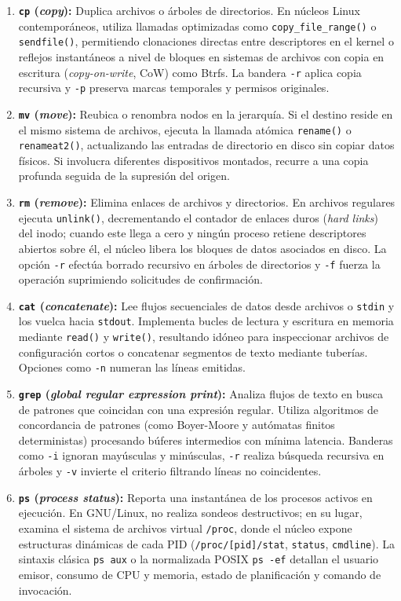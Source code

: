 \documentclass[12pt]{article}
\begin{document}
\begin{enumerate}[noitemsep, topsep=2pt]
    \item \textbf{\texttt{cp} (\textit{copy}):} Duplica archivos o árboles de directorios. En núcleos Linux contemporáneos, utiliza llamadas optimizadas como \texttt{copy\_file\_range()} o \texttt{sendfile()}, permitiendo clonaciones directas entre descriptores en el kernel o reflejos instantáneos a nivel de bloques en sistemas de archivos con copia en escritura (\textit{copy-on-write}, CoW) como Btrfs. La bandera \texttt{-r} aplica copia recursiva y \texttt{-p} preserva marcas temporales y permisos originales.
    \item \textbf{\texttt{mv} (\textit{move}):} Reubica o renombra nodos en la jerarquía. Si el destino reside en el mismo sistema de archivos, ejecuta la llamada atómica \texttt{rename()} o \texttt{renameat2()}, actualizando las entradas de directorio en disco sin copiar datos físicos. Si involucra diferentes dispositivos montados, recurre a una copia profunda seguida de la supresión del origen.
    \item \textbf{\texttt{rm} (\textit{remove}):} Elimina enlaces de archivos y directorios. En archivos regulares ejecuta \texttt{unlink()}, decrementando el contador de enlaces duros (\textit{hard links}) del inodo; cuando este llega a cero y ningún proceso retiene descriptores abiertos sobre él, el núcleo libera los bloques de datos asociados en disco. La opción \texttt{-r} efectúa borrado recursivo en árboles de directorios y \texttt{-f} fuerza la operación suprimiendo solicitudes de confirmación.
    \item \textbf{\texttt{cat} (\textit{concatenate}):} Lee flujos secuenciales de datos desde archivos o \texttt{stdin} y los vuelca hacia \texttt{stdout}. Implementa bucles de lectura y escritura en memoria mediante \texttt{read()} y \texttt{write()}, resultando idóneo para inspeccionar archivos de configuración cortos o concatenar segmentos de texto mediante tuberías. Opciones como \texttt{-n} numeran las líneas emitidas.
    \item \textbf{\texttt{grep} (\textit{global regular expression print}):} Analiza flujos de texto en busca de patrones que coincidan con una expresión regular. Utiliza algoritmos de concordancia de patrones (como Boyer-Moore y autómatas finitos deterministas) procesando búferes intermedios con mínima latencia. Banderas como \texttt{-i} ignoran mayúsculas y minúsculas, \texttt{-r} realiza búsqueda recursiva en árboles y \texttt{-v} invierte el criterio filtrando líneas no coincidentes.
    \item \textbf{\texttt{ps} (\textit{process status}):} Reporta una instantánea de los procesos activos en ejecución. En GNU/Linux, no realiza sondeos destructivos; en su lugar, examina el sistema de archivos virtual \texttt{/proc}, donde el núcleo expone estructuras dinámicas de cada PID (\texttt{/proc/[pid]/stat}, \texttt{status}, \texttt{cmdline}). La sintaxis clásica \texttt{ps aux} o la normalizada POSIX \texttt{ps -ef} detallan el usuario emisor, consumo de CPU y memoria, estado de planificación y comando de invocación.
\end{enumerate}
\end{document}
